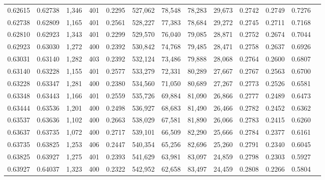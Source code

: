 \begin{tabular}{rrrrrrrrrrrrr}
0.62615 & 0.62738 & 1,346 & 401 &                                     0.2295 & 527,062 &  78,548 &  78,283 &  29,673 & 0.2742 & 0.2749 & 0.7276 \\
0.62738 & 0.62809 & 1,165 & 401 &                                     0.2561 & 528,227 &  77,383 &  78,684 &  29,272 & 0.2745 & 0.2711 & 0.7168 \\
0.62810 & 0.62923 & 1,343 & 401 &                                     0.2299 & 529,570 &  76,040 &  79,085 &  28,871 & 0.2752 & 0.2674 & 0.7044 \\
0.62923 & 0.63030 & 1,272 & 400 &                                     0.2392 & 530,842 &  74,768 &  79,485 &  28,471 & 0.2758 & 0.2637 & 0.6926 \\
0.63031 & 0.63140 & 1,282 & 403 &                                     0.2392 & 532,124 &  73,486 &  79,888 &  28,068 & 0.2764 & 0.2600 & 0.6807 \\
0.63140 & 0.63228 & 1,155 & 401 &                                     0.2577 & 533,279 &  72,331 &  80,289 &  27,667 & 0.2767 & 0.2563 & 0.6700 \\
0.63228 & 0.63347 & 1,281 & 400 &                                     0.2380 & 534,560 &  71,050 &  80,689 &  27,267 & 0.2773 & 0.2526 & 0.6581 \\
0.63348 & 0.63443 & 1,166 & 401 &                                     0.2559 & 535,726 &  69,884 &  81,090 &  26,866 & 0.2777 & 0.2489 & 0.6473 \\
0.63444 & 0.63536 & 1,201 & 400 &                                     0.2498 & 536,927 &  68,683 &  81,490 &  26,466 & 0.2782 & 0.2452 & 0.6362 \\
0.63537 & 0.63636 & 1,102 & 400 &                                     0.2663 & 538,029 &  67,581 &  81,890 &  26,066 & 0.2783 & 0.2415 & 0.6260 \\
0.63637 & 0.63735 & 1,072 & 400 &                                     0.2717 & 539,101 &  66,509 &  82,290 &  25,666 & 0.2784 & 0.2377 & 0.6161 \\
0.63735 & 0.63825 & 1,253 & 406 &                                     0.2447 & 540,354 &  65,256 &  82,696 &  25,260 & 0.2791 & 0.2340 & 0.6045 \\
0.63825 & 0.63927 & 1,275 & 401 &                                     0.2393 & 541,629 &  63,981 &  83,097 &  24,859 & 0.2798 & 0.2303 & 0.5927 \\
0.63927 & 0.64037 & 1,323 & 400 &                                     0.2322 & 542,952 &  62,658 &  83,497 &  24,459 & 0.2808 & 0.2266 & 0.5804 \\

\end{tabular}
